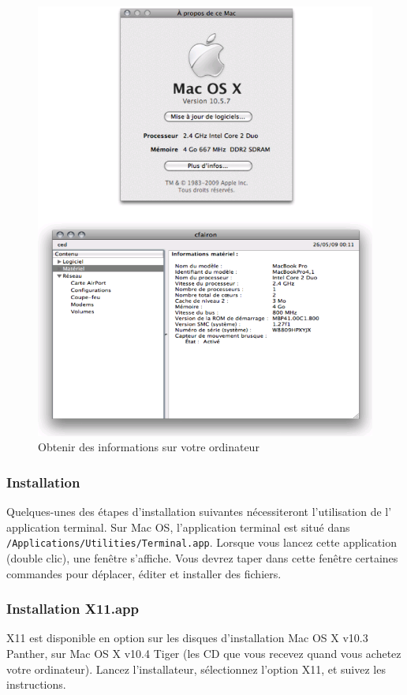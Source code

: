 \begin{figure}[!h]
\begin{center}
\includegraphics[width=13cm]{resources/img/fig-mac1.png}
\caption{Obtenir des informations sur votre ordinateur\label{fig-mac1}}
\end{center}
\end{figure}

\clearpage

\subsubsection{Installation}
\noindent Quelques-unes des étapes d'installation suivantes nécessiteront l'utilisation de l'
application terminal. Sur Mac OS, l'application terminal est situé dans
\verb+/Applications/Utilities/Terminal.app+.  Lorsque vous lancez cette application
(double clic), une fenêtre s'affiche. Vous devrez taper dans cette fenêtre
certaines commandes pour déplacer, éditer et installer des fichiers.

\subsubsection{Installation X11.app}
\noindent X11 est disponible en option sur les disques d'installation Mac OS X v10.3 Panther, sur
Mac OS X v10.4 Tiger (les CD que vous recevez quand vous achetez votre ordinateur). Lancez
l'installateur, sélectionnez l'option X11, et suivez les instructions.

